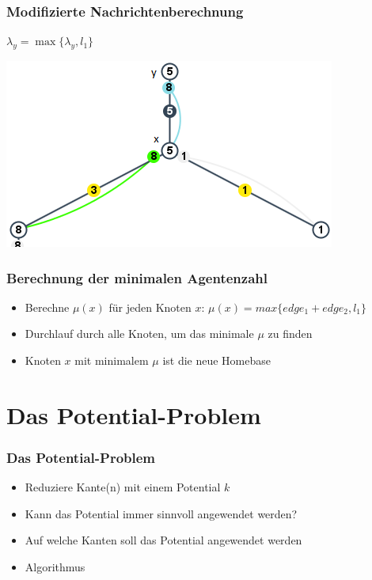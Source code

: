 \documentclass{beamer}
\begin{document}
	\begin{frame}
		\frametitle{Modifizierte Nachrichtenberechnung}
		\large
		
		$\lambda_{y} = \max\{\lambda_{y}, l_{1}\}$
		
		\centering
		\includegraphics[width=.75\textwidth]{bilder/abb_neu_msgData.png}
		
	\end{frame}
	
	\begin{frame}
		\frametitle{Berechnung der minimalen Agentenzahl}
		\large
		
		\begin{itemize}
			\item Berechne $\mu(x)$ für jeden Knoten $x$: $\mu(x) = max\{edge_{1} + edge_{2},  l_{1}\}$
			
			\item Durchlauf durch alle Knoten, um das minimale $\mu$ zu finden
			
			\item Knoten $x$ mit minimalem $\mu$ ist die neue Homebase
		\end{itemize}
		
		
	\end{frame}

	
	\section{Das Potential-Problem}
	\begin{frame}
		\frametitle{Das Potential-Problem}
		\large
		
		\begin{itemize}
			\item Reduziere Kante(n) mit einem Potential $k$
			
			\item Kann das Potential immer sinnvoll angewendet werden?
			
			\item Auf welche Kanten soll das Potential angewendet werden
			
			\item Algorithmus
			
		\end{itemize}
		
	\end{frame}
	
\end{document}
